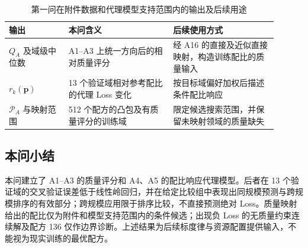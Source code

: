 \begin{table}[htbp]
 \centering\small
 \caption{第一问在附件数据和代理模型支持范围内的输出及后续用途}
 \label{tab:q1-output}
 \begin{tabular}{p{0.20\linewidth}p{0.35\linewidth}p{0.35\linewidth}}
 \toprule
 输出 & 本问含义 & 后续使用方式\\
 \midrule
 $Q_A$ 及域级中位数 & A1--A3 上统一方向后的相对质量评分 & 经 A16 的直接及近似直接映射，构造训练配比的质量输入\\
 $r_k(\boldsymbol p)$ & 13 个验证域相对参考配比的代理 Loss 变化 & 按目标域偏好加权后描述条件配比响应\\
 $\mathcal P_A$ 与映射范围 & 512 个配方的凸包及有质量评分的训练域 & 限定候选搜索范围，并保留未映射领域的质量缺失\\
 \bottomrule
 \end{tabular}
\end{table}

\subsection{本问小结}

本问建立了 A1--A3 的质量评分和 A4、A5 的配比响应代理模型。后者在 13 个验证域的交叉验证误差低于线性岭回归，并在给定比较组中表现出同规模预测与跨规模排序的有效部分；跨规模应用限于排序比较，不直接预测绝对 Loss。质量映射给出的配比仅为附件和模型支持范围内的条件候选；出现负 Loss 的无质量约束连续解及配方 136 仅作边界诊断。上述结果为后续标度律与资源配置提供输入，不能视为现实训练的最优配方。
